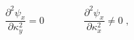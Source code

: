 \begin{equation}
{\frac{\partial^2 \psi_x }{\partial \kappa^2_y}} = 0\qquad\qquad
	{\frac{\partial^2 \psi_x }{\partial \kappa^2_x}} \ne 0 \; ,	
\label{eq:laplace1} 
\end{equation}

